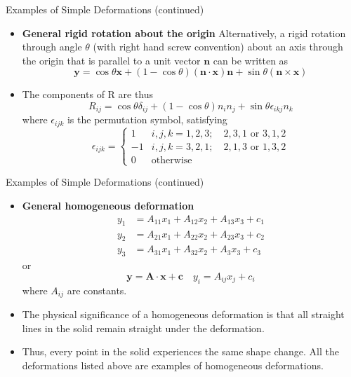 \documentclass{beamer}
\begin{document}
\begin{frame}{Examples of Simple Deformations (continued)}
  \begin{itemize}
    \item   \textbf{General rigid rotation about the origin}
    Alternatively, a rigid rotation through angle \(\theta\) (with right hand screw convention) about an axis through the origin that is parallel to a unit vector \(\mathbf{n}\) can be written as
    $$ \mathbf{y} = \cos\theta \mathbf{x} + (1 - \cos\theta)(\mathbf{n} \cdot \mathbf{x})\mathbf{n} + \sin\theta (\mathbf{n} \times \mathbf{x}) $$
    \item   The components of R are thus
    $$ R_{ij} = \cos\theta \delta_{ij} + (1 - \cos\theta)n_i n_j + \sin\theta \epsilon_{ikj} n_k $$
    where \(\epsilon_{ijk}\) is the permutation symbol, satisfying
    $$
    \epsilon_{ijk}=\begin{cases}
      1 & i,j,k = 1,2,3; \quad 2,3,1 \text{ or } 3,1,2 \\
      -1 & i,j,k = 3,2,1; \quad 2,1,3 \text{ or } 1,3,2 \\
      0 & \text{otherwise}
    \end{cases}
    $$
  \end{itemize}
\end{frame}

\begin{frame}{Examples of Simple Deformations (continued)}
  \begin{itemize}
    \item   \textbf{General homogeneous deformation}
    $$
    \begin{aligned}
      y_1 &= A_{11} x_1 + A_{12} x_2 + A_{13} x_3 + c_1 \\
      y_2 &= A_{21} x_1 + A_{22} x_2 + A_{23} x_3 + c_2 \\
      y_3 &= A_{31} x_1 + A_{32} x_2 + A_{3} x_3 + c_3
    \end{aligned}
    $$
    or
    $$ \mathbf{y} = \mathbf{A} \cdot \mathbf{x} + \mathbf{c} \quad y_i = A_{ij} x_j + c_i $$
    where \(A_{ij}\) are constants.
    \item   The physical significance of a homogeneous deformation is that all straight lines in the solid remain straight under the deformation.
    \item   Thus, every point in the solid experiences the same shape change. All the deformations listed above are examples of homogeneous deformations.
  \end{itemize}
\end{frame}
\end{document}
